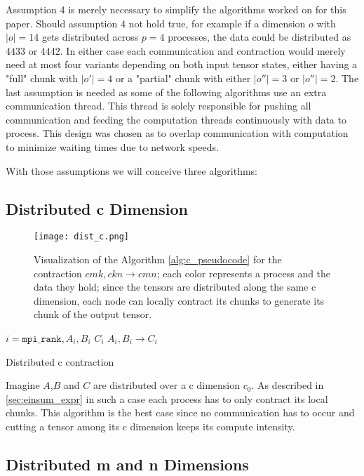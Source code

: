 Assumption 4 is merely necessary to simplify the algorithms worked on for this paper.
Should assumption 4 not hold true, for example if a dimension $o$ with $|o|=14$ gets distributed across $p=4$ processes, the data could be distributed as $4 4 3 3$ or $4 4 4 2$.
In either case each communication and contraction would merely need at most four variants depending on both input tensor states, either having a "full" chunk with $|o'|=4$ or a "partial" chunk with either $|o''|=3$ or $|o''|=2$.
The last assumption is needed as some of the following algorithms use an extra communication thread.
This thread is solely responsible for pushing all communication and feeding the computation threads continuously with data to process.
This design was chosen as to overlap communication with computation to minimize waiting times due to network speeds.

With those assumptions we will conceive three algorithms:

\subsection{Distributed c Dimension}

\begin{figure}[ht]
    \centering\texttt{[image: dist\_c.png]} 
    \caption{Visualization of the Algorithm \ref{alg:c_pseudocode} for the contraction $cmk,ckn \rightarrow cmn$; 
    each color represents a process and the data they hold; 
    since the tensors are distributed along the same c dimension, each node can locally contract its chunks to generate its chunk of the output tensor.}
    \label{fig:c_algo}
    \end{figure}

\begin{algorithm}[ht]
    \begin{algorithmic}
    \Require $i = \texttt{mpi\_rank}, A_i, B_i$
    \Ensure $C_i$
    \State $A_i, B_i \rightarrow C_i$
\end{algorithmic}
\caption{Distributed c contraction}
\label{alg:c_pseudocode}
\end{algorithm}

Imagine $A$,$B$ and $C$ are distributed over a c dimension $c_0$.
As described in \ref{sec:einsum_expr} in such a case each process has to only contract its local chunks.
This algorithm is the best case since no communication has to occur and cutting a tensor among its c dimension keeps its compute intensity.

\subsection{Distributed m and n Dimensions}



